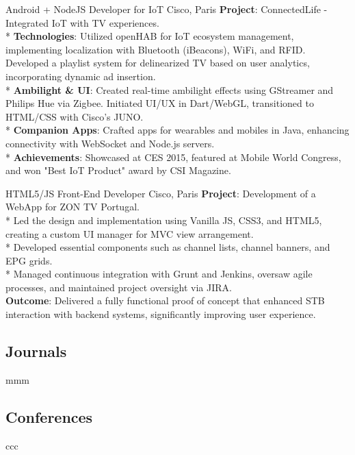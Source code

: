 \documentclass[
  a4paper,
   maincolor=cvblue,
   sectioncolor=cvblue,
]{fortysecondscv}
\begin{document}
\begin{cvtable}
    {Android + NodeJS Developer for IoT}
    {Cisco, Paris}
    {
      \textbf{Project}: ConnectedLife - Integrated IoT with TV experiences.\\
      * \textbf{Technologies}: Utilized openHAB for IoT ecosystem management, implementing localization with Bluetooth (iBeacons), WiFi, and RFID. Developed a playlist system for delinearized TV based on user analytics, incorporating dynamic ad insertion.\\
      * \textbf{Ambilight \& UI}: Created real-time ambilight effects using GStreamer and Philips Hue via Zigbee. Initiated UI/UX in Dart/WebGL, transitioned to HTML/CSS with Cisco’s JUNO.\\
      * \textbf{Companion Apps}: Crafted apps for wearables and mobiles in Java, enhancing connectivity with WebSocket and Node.js servers.\\
      * \textbf{Achievements}: Showcased at CES 2015, featured at Mobile World Congress, and won "Best IoT Product" award by CSI Magazine.\\
    }
\end{cvtable}



\begin{cvtable}
    {HTML5/JS Front-End Developer}
    {Cisco, Paris}
    {
      \textbf{Project}: Development of a WebApp for ZON TV Portugal.\\
        * Led the design and implementation using Vanilla JS, CSS3, and HTML5, creating a custom UI manager for MVC view arrangement.\\
        * Developed essential components such as channel lists, channel banners, and EPG grids.\\
        * Managed continuous integration with Grunt and Jenkins, oversaw agile processes, and maintained project oversight via JIRA.\\
      \textbf{Outcome}:
        Delivered a fully functional proof of concept that enhanced STB interaction with backend systems, significantly improving user experience.
    }
\end{cvtable}






\newpage
\makethirdsidebar

\subsection{Journals}
	\begin{itemize}
	{\small
	\item mmm}
\end{itemize}
\vskip20pt
 \subsection{Conferences}
\begin{itemize}
{\small
\item ccc}
		\end{itemize}
\end{document}
